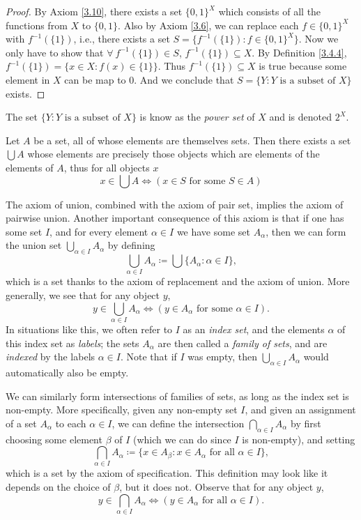\begin{proof}
By Axiom \ref{3.10}, there exists a set \(\{0, 1\}^X\) which consists of all the functions from \(X\) to \(\{0, 1\}\).
Also by Axiom \ref{3.6}, we can replace each \(f \in \{0, 1\}^X\) with \(f^{-1}(\{1\})\), i.e., there exists a set \(S = \{f^{-1}(\{1\}) : f \in \{0, 1\}^X\}\).
Now we only have to show that \(\forall\ f^{-1}(\{1\}) \in S\), \(f^{-1}(\{1\}) \subseteq X\).
By Definition \ref{3.4.4}, \(f^{-1}(\{1\}) = \{x \in X : f(x) \in \{1\}\}\).
Thus \(f^{-1}(\{1\}) \subseteq X\) is true because some element in \(X\) can be map to \(0\).
And we conclude that \(S = \{Y : Y \text{ is a subset of } X\}\) exists.
\end{proof}

\begin{remark}\label{3.4.10}
The set \(\{Y : Y \text{ is a subset of } X\}\) is know as the \emph{power set} of \(X\) and is denoted \(2^X\).
\end{remark}

\begin{axiom}[Union]\label{3.11}
Let \(A\) be a set, all of whose elements are themselves sets.
Then there exists a set \(\bigcup A\) whose elements are precisely those objects which are elements of the elements of \(A\), thus for all objects \(x\)
\[
    x \in \bigcup A \iff (x \in S \text{ for some } S \in A)
\]
\end{axiom}

The axiom of union, combined with the axiom of pair set, implies the axiom of pairwise union.
Another important consequence of this axiom is that if one has some set \(I\), and for every element \(\alpha \in I\) we have some set \(A_{\alpha}\), then we can form the union set \(\bigcup_{\alpha \in I} A_{\alpha}\) by defining
\[
    \bigcup_{\alpha \in I} A_{\alpha} \coloneqq \bigcup \{A_{\alpha} : \alpha \in I\},
\]
which is a set thanks to the axiom of replacement and the axiom of union.
More generally, we see that for any object \(y\),
\[
    y \in \bigcup_{\alpha \in I} A_{\alpha} \iff (y \in A_{\alpha} \text{ for some } \alpha \in I).
\]
In situations like this, we often refer to \(I\) as an \emph{index set}, and the elements \(\alpha\) of this index set as \emph{labels};
the sets \(A_{\alpha}\) are then called a \emph{family of sets}, and are \emph{indexed} by the labels \(\alpha \in I\).
Note that if \(I\) was empty, then \(\bigcup_{\alpha \in I} A_{\alpha}\) would automatically also be empty.

We can similarly form intersections of families of sets, as long as the index set is non-empty.
More specifically, given any non-empty set \(I\), and given an assignment of a set \(A_{\alpha}\) to each \(\alpha \in I\), we can define the intersection \(\bigcap_{\alpha \in I} A_{\alpha}\) by first choosing some element \(\beta\) of \(I\) (which we can do since \(I\) is non-empty), and setting
\[
    \bigcap_{\alpha \in I} A_{\alpha} \coloneqq \{x \in A_{\beta} : x \in A_{\alpha} \text{ for all } \alpha \in I\},
\]
which is a set by the axiom of specification.
This definition may look like it depends on the choice of \(\beta\), but it does not.
Observe that for any object \(y\),
\[
    y \in \bigcap_{\alpha \in I} A_{\alpha} \iff (y \in A_{\alpha} \text{ for all } \alpha \in I).
\]

